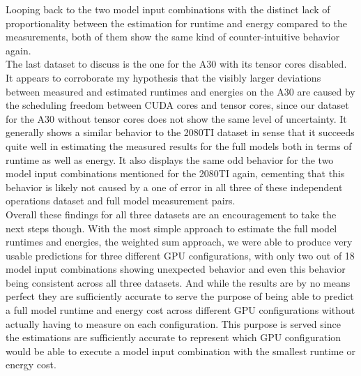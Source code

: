 \documentclass[conference]{IEEEtran}
\begin{document}
Looping back to the two model input combinations with the distinct lack of proportionality between the estimation for runtime and energy compared to the measurements, both of them show the same kind of counter-intuitive behavior again. \\
The last dataset to discuss is the one for the A30 with its tensor cores disabled. It appears to corroborate my hypothesis that the visibly larger deviations between measured and estimated runtimes and energies on the A30 are caused by the scheduling freedom between CUDA cores and tensor cores, since our dataset for the A30 without tensor cores does not show the same level of uncertainty. It generally shows a similar behavior to the 2080TI dataset in sense that it succeeds quite well in estimating the measured results for the full models both in terms of runtime as well as energy. It also displays the same odd behavior for the two model input combinations mentioned for the 2080TI again, cementing that this behavior is likely not caused by a one of error in all three of these independent operations dataset and full model measurement pairs. \\
Overall these findings for all three datasets are an encouragement to take the next steps though. With the most simple approach to estimate the full model runtimes and energies, the weighted sum approach, we were able to produce very usable predictions for  three different GPU configurations, with only two out of 18 model input combinations showing unexpected behavior and even this behavior being consistent across all three datasets. And while the results are by no means perfect they are sufficiently accurate to serve the purpose of being able to predict a full model runtime and energy cost across different GPU configurations without actually having to measure on each configuration. This purpose is served since the estimations are sufficiently accurate to represent which GPU configuration would be able to execute a model input combination with the smallest runtime or energy cost. 



%


\end{document}
